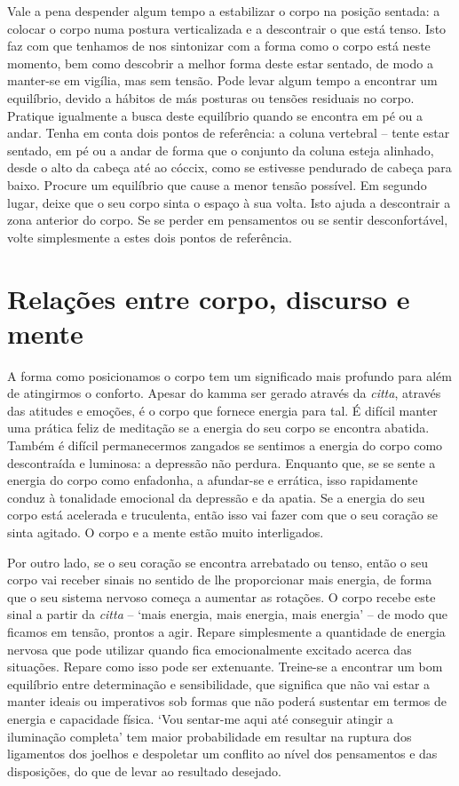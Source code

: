 Vale a pena despender algum tempo a estabilizar o corpo na posição sentada: a colocar o corpo numa postura verticalizada e a descontrair o que está tenso. Isto faz com que tenhamos de nos sintonizar com a forma como o corpo está neste momento, bem como descobrir a melhor forma deste estar sentado, de modo a manter-se em vigília, mas sem tensão. Pode levar algum tempo a encontrar um equilíbrio, devido a hábitos de más posturas ou tensões residuais no corpo. Pratique igualmente a busca deste equilíbrio quando se encontra em pé ou a andar. Tenha em conta dois pontos de referência: a coluna vertebral -- tente estar sentado, em pé ou a andar de forma que o conjunto da coluna esteja alinhado, desde o alto da cabeça até ao cóccix, como se estivesse pendurado de cabeça para baixo. Procure um equilíbrio que cause a menor tensão possível. Em segundo lugar, deixe que o seu corpo sinta o espaço à sua volta. Isto ajuda a descontrair a zona anterior do corpo. Se se perder em pensamentos ou se sentir desconfortável, volte simplesmente a estes dois pontos de referência.

\section{Relações entre corpo, discurso e mente}

A forma como posicionamos o corpo tem um significado mais profundo para além de atingirmos o conforto. Apesar do kamma ser gerado através da \emph{citta}, através das atitudes e emoções, é o corpo que fornece energia para tal. É difícil manter uma prática feliz de meditação se a energia do seu corpo se encontra abatida. Também é difícil permanecermos zangados se sentimos a energia do corpo como descontraída e luminosa: a depressão não perdura. Enquanto que, se se sente a energia do corpo como enfadonha, a afundar-se e errática, isso rapidamente conduz à tonalidade emocional da depressão e da apatia. Se a energia do seu corpo está acelerada e truculenta, então isso vai fazer com que o seu coração se sinta agitado. O corpo e a mente estão muito interligados.

Por outro lado, se o seu coração se encontra arrebatado ou tenso, então o seu corpo vai receber sinais no sentido de lhe proporcionar mais energia, de forma que o seu sistema nervoso começa a aumentar as rotações. O corpo recebe este sinal a partir da \emph{citta} -- `mais energia, mais energia, mais energia' -- de modo que ficamos em tensão, prontos a agir. Repare simplesmente a quantidade de energia nervosa que pode utilizar quando fica emocionalmente excitado acerca das situações. Repare como isso pode ser extenuante. Treine-se a encontrar um bom equilíbrio entre determinação e sensibilidade, que significa que não vai estar a manter ideais ou imperativos sob formas que não poderá sustentar em termos de energia e capacidade física. `Vou sentar-me aqui até conseguir atingir a iluminação completa' tem maior probabilidade em resultar na ruptura dos ligamentos dos joelhos e despoletar um conflito ao nível dos pensamentos e das disposições, do que de levar ao resultado desejado.

